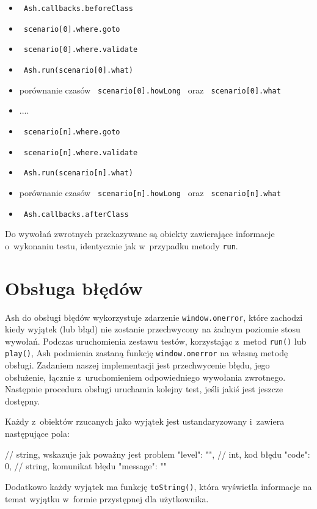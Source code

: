 \documentclass[brudnopis]{xmgr}
\begin{document}
\begin{itemize}
  \item \texttt{ Ash.callbacks.beforeClass }
  \item \texttt{ scenario[0].where.goto }
  \item \texttt{ scenario[0].where.validate }
  \item \texttt{ Ash.run(scenario[0].what) }
  \item  porównanie czasów \texttt{ scenario[0].howLong } oraz \texttt{ scenario[0].what }
  \item  ....
  \item \texttt{ scenario[n].where.goto }
  \item \texttt{ scenario[n].where.validate }
  \item \texttt{ Ash.run(scenario[n].what) }
  \item  porównanie czasów \texttt{ scenario[n].howLong } oraz \texttt{ scenario[n].what }
  \item \texttt{ Ash.callbacks.afterClass }
\end{itemize}

Do wywołań zwrotnych przekazywane są obiekty zawierające informacje o~wykonaniu testu, identycznie jak w~przypadku metody \texttt{run}.

\section{Obsługa błędów}

Ash do obsługi błędów wykorzystuje zdarzenie \texttt{window.onerror}, które zachodzi kiedy wyjątek (lub błąd) nie zostanie przechwycony na żadnym poziomie stosu wywołań. Podczas uruchomienia zestawu testów, korzystając z~metod \texttt{run()} lub \texttt{play()}, Ash podmienia zastaną funkcję \texttt{window.onerror} na własną metodę obsługi. Zadaniem naszej implementacji jest przechwycenie błędu, jego obsłużenie, łącznie z~uruchomieniem odpowiedniego wywołania zwrotnego. Następnie procedura obsługi uruchamia kolejny test, jeśli jakiś jest jeszcze dostępny. 

Każdy z~obiektów rzucanych jako wyjątek jest ustandaryzowany i~zawiera następujące pola: 
\begin{javascriptcode}
	{
		// string, wskazuje jak poważny jest problem
		"level": "",
		// int, kod błędu 
		"code": 0, 
		// string, komunikat błędu
		"message": ""
	}
\end{javascriptcode}
Dodatkowo każdy wyjątek ma funkcję \texttt{toString()}, która wyświetla informacje na temat wyjątku w~formie przystępnej dla użytkownika.
\end{document}
